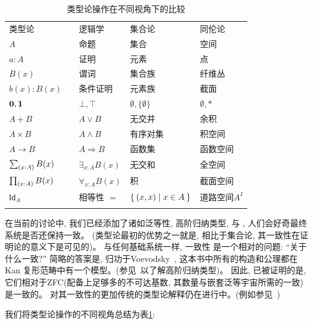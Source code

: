 \begin{table}[htb]
  \centering
  \OPTsmalltable
 \begin{tabular}{lllll}
    \toprule
       类型论 && 逻辑学 & 集合论 & 同伦论\\ \addlinespace[2pt]
    \midrule
       $A$ && 命题 & 集合 & 空间\\ \addlinespace[2pt]
       $a:A$ && 证明 & 元素 & 点 \\ \addlinespace[2pt]
       $B(x)$ && 谓词 & 集合族 & 纤维丛 \\ \addlinespace[2pt]
       $b(x) : B(x)$ && 条件证明 & 元素族 & 截面\\ \addlinespace[2pt]
       $\mathbf{0}, \mathbf{1}$ && $\bot, \top$ & $\emptyset, \{ \emptyset \}$ & $\emptyset, *$\\ \addlinespace[2pt]
       $A + B$ && $A\vee B$ & 无交并 & 余积 \\ \addlinespace[2pt]
       $A\times B$ && $A\wedge B$ & 有序对集 & 积空间 \\ \addlinespace[2pt]
       $A\to B$ && $A\Rightarrow B$ & 函数集 & 函数空间 \\ \addlinespace[2pt]
       $\sm{x:A}B(x)$ &&  $\exists_{x:A}B(x)$ & 无交和 & 全空间 \\ \addlinespace[2pt]
       $\prd{x:A}B(x)$ &&  $\forall_{x:A}B(x)$ & 积 & 截面空间 \\ \addlinespace[2pt]
       $\mathsf{Id}_{A}$ && 相等性 $=$ & $\Set{{\mathopen{}(x,x)\mathclose{}} | x\in A}$ & 道路空间$A^I$ \\ \addlinespace[2pt]
    \bottomrule
  \end{tabular}
  \caption{类型论操作在不同视角下的比较}\label{tab:pov}
\end{table}

在当前的讨论中, 我们已经添加了诸如泛等性, 高阶归纳类型, \choice{} 与 \LEM{}, 人们会好奇最终系统是否还保持一致。
(类型论最初的优势之一就是, 相比于集合论, 其一致性在证明论的意义下是可见的)。
与任何基础系统一样, 一致性 是一个相对的问题: ``关于什么一致?''
简略的答案是, 归功于Voevodsky~\cite{klv:ssetmodel}, 这本书中所有的构造和公理都在Kan  复形范畴中有一个模型。(参见~\cite{ls:hits}以了解高阶归纳类型)。
因此, 已被证明的是, 它们相对于ZFC(配备上足够多的不可达基数,
%
其数量与嵌套泛等宇宙所需的一致)是一致的。
对其一致性的更加传统的类型论解释仍在进行中。(例如参见~\cite{lh:canonicity,coquand2012constructive})

我们将类型论操作的不同视角总结为表\ref{tab:pov}:

